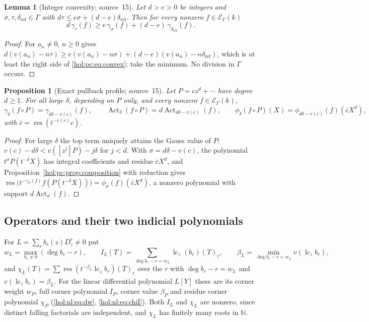 \documentclass[11pt]{article}
\numberwithin{equation}{section}
\newtheorem{lemma}[theorem]{Lemma}
\newtheorem{proposition}[theorem]{Proposition}
\theoremstyle{definition}
\theoremstyle{remark}
\newcommand{\N}{\mathbb N}
\newcommand{\lc}{\operatorname{lc}}
\newcommand{\res}{\operatorname{res}}
\newcommand{\fall}[2]{(#1)_{\underline{#2}}}
\newcommand{\EK}{\mathcal E_\Gamma(k)}
\begin{document}
\begin{lemma}[Integer convexity; source~15]\label{hol:pc:lem:convex}
Let $d>e>0$ be integers and $\sigma,\tau,\delta_{\mathrm{ref}}\in\Gamma$ with
$d\tau\le e\sigma+(d-e)\delta_{\mathrm{ref}}$. Then for every nonzero $f\in\EK$
\begin{equation}\label{hol:pc:eq:convex}
 d\,\gamma_\tau(f)\ge e\,\gamma_\sigma(f)+(d-e)\,\gamma_{\delta_{\mathrm{ref}}}(f).
\end{equation}
\end{lemma}

\begin{proof}
For $a_n\ne0$, $n\ge0$ gives $d(v(a_n)-n\tau)\ge e(v(a_n)-n\sigma)+(d-e)(v(a_n)-n
\delta_{\mathrm{ref}})$, which is at least the right side of
\eqref{hol:pc:eq:convex}; take the minimum. No division in $\Gamma$ occurs.
\end{proof}

\begin{proposition}[Exact pullback profile; source~15]
\label{hol:pc:prop:pullback}
Let $P=cz^d+\cdots$ have degree $d\ge1$. For all large $\delta$, depending on
$P$ only, and every nonzero $f\in\EK$,
\begin{equation}\label{hol:pc:eq:pullback}
 \gamma_\delta(f\circ P)=\gamma_{d\delta-v(c)}(f),\qquad
 \operatorname{Act}_\delta(f\circ P)=d\operatorname{Act}_{d\delta-v(c)}(f),\qquad
 \phi_\delta(f\circ P)(X)=\phi_{d\delta-v(c)}(f)(\bar cX^d),
\end{equation}
with $\bar c=\res(t^{-v(c)}c)$.
\end{proposition}

\begin{proof}
For large $\delta$ the top term uniquely attains the Gauss value of $P$:
$v(c)-d\delta<v([z^j]P)-j\delta$ for $j<d$. With $\sigma=d\delta-v(c)$, the
polynomial $t^\sigma P(t^{-\delta}X)$ has integral coefficients and residue
$\bar cX^d$, and Proposition~\ref{hol:pc:prop:composition} with reduction gives
$\res\bigl(t^{-\gamma_\sigma(f)}f(P(t^{-\delta}X))\bigr)=\phi_\sigma(f)(\bar
cX^d)$, a nonzero polynomial with support $d\operatorname{Act}_\sigma(f)$.
\end{proof}

\subsection{Operators and their two indicial polynomials}
\label{hol:pc:sub:operators}

For $L=\sum_rb_r(z)D_z^r\ne0$ put
\begin{equation}\label{hol:pc:eq:indicial}
 w_L=\max_{b_r\ne0}(\deg b_r-r),\qquad
 I_L(T)=\sum_{\deg b_r-r=w_L}\lc_z(b_r)\fall Tr,\qquad
 \beta_L=\min_{\deg b_r-r=w_L}v(\lc_z b_r),
\end{equation}
and $\chi_L(T)=\sum\res(t^{-\beta_L}\lc_z b_r)\fall Tr$ over the $r$ with
$\deg b_r-r=w_L$ and $v(\lc_z b_r)=\beta_L$. For the linear differential
polynomial $L[Y]$ these are its corner weight $w_P$, full corner polynomial
$I_P$, corner value $\beta_P$ and residue corner polynomial $\chi_P$
(\eqref{hol:nl:eq:dw}, \eqref{hol:nl:eq:chiI}). Both $I_L$ and $\chi_L$ are
nonzero, since distinct falling factorials are independent, and $\chi_L$ has
finitely many roots in $\N$.
\end{document}
